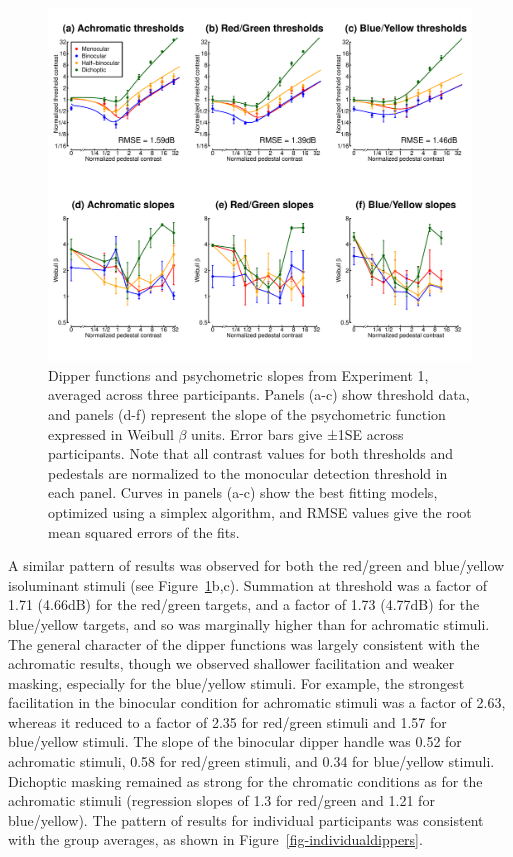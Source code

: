 \documentclass[
  letterpaper,
  DIV=11,
  numbers=noendperiod]{scrartcl}
\begin{document}
\begin{figure}

{\centering \includegraphics{Figures/dipperssimplex.pdf}

}

\caption{\label{fig-dipperfig}Dipper functions and psychometric slopes
from Experiment 1, averaged across three participants. Panels (a-c) show
threshold data, and panels (d-f) represent the slope of the psychometric
function expressed in Weibull \(\beta\) units. Error bars give ±1SE
across participants. Note that all contrast values for both thresholds
and pedestals are normalized to the monocular detection threshold in
each panel. Curves in panels (a-c) show the best fitting models,
optimized using a simplex algorithm, and RMSE values give the root mean
squared errors of the fits.}

\end{figure}

A similar pattern of results was observed for both the red/green and
blue/yellow isoluminant stimuli (see Figure~\ref{fig-dipperfig}b,c).
Summation at threshold was a factor of 1.71 (4.66dB) for the red/green
targets, and a factor of 1.73 (4.77dB) for the blue/yellow targets, and
so was marginally higher than for achromatic stimuli. The general
character of the dipper functions was largely consistent with the
achromatic results, though we observed shallower facilitation and weaker
masking, especially for the blue/yellow stimuli. For example, the
strongest facilitation in the binocular condition for achromatic stimuli
was a factor of 2.63, whereas it reduced to a factor of 2.35 for
red/green stimuli and 1.57 for blue/yellow stimuli. The slope of the
binocular dipper handle was 0.52 for achromatic stimuli, 0.58 for
red/green stimuli, and 0.34 for blue/yellow stimuli. Dichoptic masking
remained as strong for the chromatic conditions as for the achromatic
stimuli (regression slopes of 1.3 for red/green and 1.21 for
blue/yellow). The pattern of results for individual participants was
consistent with the group averages, as shown in
Figure~\ref{fig-individualdippers}.
\end{document}
